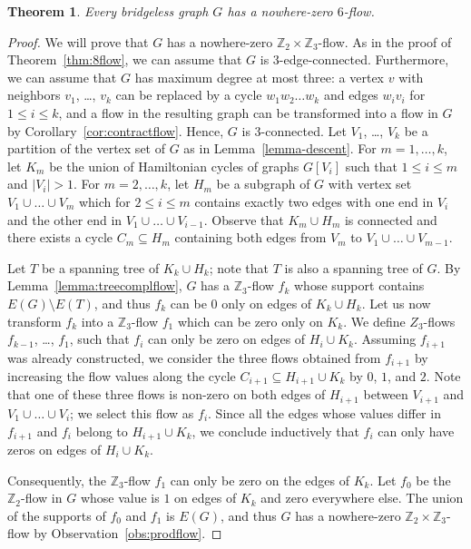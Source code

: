 \documentclass[12pt,twoside,openright,a4paper]{book}
\newtheorem{theorem}{Theorem}[chapter]
\begin{document}
\begin{theorem}\label{thm:6flow}
Every bridgeless graph $G$ has a nowhere-zero $6$-flow.
\end{theorem}
\begin{proof}
We will prove that $G$ has a nowhere-zero $\mathbb{Z}_2\times\mathbb{Z}_3$-flow.
As in the proof of Theorem~\ref{thm:8flow}, we can assume that $G$ is $3$-edge-connected.  Furthermore, we can assume that $G$ has maximum degree at most
three: a vertex $v$ with neighbors $v_1$, \ldots, $v_k$ can be replaced by a cycle $w_1w_2\ldots w_k$ and edges $w_iv_i$ for $1\le i\le k$,
and a flow in the resulting graph can be transformed into a flow in $G$ by Corollary~\ref{cor:contractflow}.  Hence,
$G$ is $3$-connected.  Let $V_1$, \ldots, $V_k$ be a partition of the vertex set of $G$ as in Lemma~\ref{lemma-descent}.
For $m=1, \ldots, k$, let $K_m$ be the union of Hamiltonian cycles of graphs $G[V_i]$ such that $1\le i\le m$ and $|V_i|>1$.
For $m=2, \ldots, k$, let $H_m$ be a subgraph of $G$ with vertex set $V_1\cup \ldots\cup V_m$ which for $2\le i\le m$ contains exactly two edges
with one end in $V_i$ and the other end in $V_1\cup \ldots\cup V_{i-1}$.  Observe that $K_m\cup H_m$ is connected and there exists a cycle $C_m\subseteq H_m$
containing both edges from $V_m$ to $V_1\cup\ldots\cup V_{m-1}$.

Let $T$ be a spanning tree of $K_k\cup H_k$; note that $T$ is also a spanning tree of $G$.  By Lemma~\ref{lemma:treecomplflow}, $G$ has a $\mathbb{Z}_3$-flow $f_k$
whose support contains $E(G)\setminus E(T)$, and thus $f_k$ can be $0$ only on edges of $K_k\cup H_k$.  Let us now transform $f_k$ into a $\mathbb{Z}_3$-flow $f_1$
which can be zero only on $K_k$.  We define $Z_3$-flows $f_{k-1}$, \ldots, $f_1$, such that $f_i$ can only be zero
on edges of $H_i\cup K_k$.  Assuming $f_{i+1}$ was already constructed, we consider the three flows obtained from $f_{i+1}$ by increasing the flow values
along the cycle $C_{i+1}\subseteq H_{i+1}\cup K_k$ by $0$, $1$, and $2$.  Note that one of these three flows is non-zero on both edges of $H_{i+1}$ between $V_{i+1}$ and $V_1\cup\ldots\cup V_i$;
we select this flow as $f_i$.  Since all the edges whose values differ in $f_{i+1}$ and $f_i$ belong to $H_{i+1}\cup K_k$, we conclude inductively that $f_i$ can only have zeros
on edges of $H_i\cup K_k$.

Consequently, the $\mathbb{Z}_3$-flow $f_1$ can only be zero on the edges of $K_k$.
Let $f_0$ be the $\mathbb{Z}_2$-flow in $G$ whose value is $1$ on edges of $K_k$ and zero everywhere else.
The union of the supports of $f_0$ and $f_1$ is $E(G)$, and thus $G$ has a nowhere-zero $\mathbb{Z}_2\times \mathbb{Z}_3$-flow by Observation~\ref{obs:prodflow}.
\end{proof}
\end{document}
